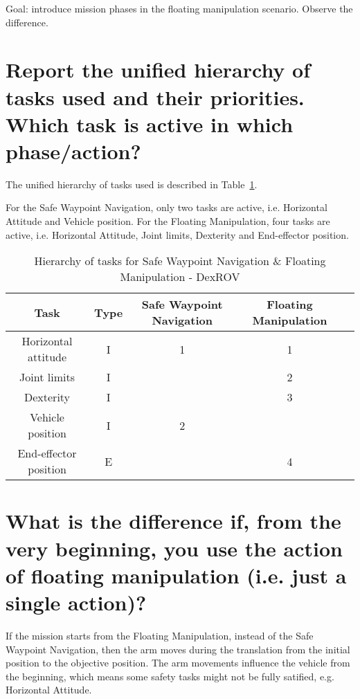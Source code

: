 	Goal: introduce mission phases in the floating manipulation scenario. Observe
	the difference.
	\begin{parts}
		\part{Report the unified hierarchy of tasks used and their
		priorities. Which task is active in which phase/action?}

		\begin{solutionorbox}
			The unified hierarchy of tasks used is described in
			Table~\ref{table:tkip_swn_fm_dexrov}. 

			For the Safe Waypoint Navigation, only two tasks are
			active, i.e. Horizontal Attitude and Vehicle position.
			For the Floating Manipulation, four tasks are active,
			i.e. Horizontal Attitude, Joint limits, Dexterity and
			End-effector position.
		\end{solutionorbox}
		
		\begin{table}[htb] 
			\caption{Hierarchy of tasks for Safe Waypoint Navigation
			\& Floating Manipulation - DexROV}
			\label{table:tkip_swn_fm_dexrov}
			\begin{center}
				\footnotesize
				\begin{tabular}{ccccc}
					\toprule Task & Type &
					Safe Waypoint Navigation & Floating
					Manipulation\\
					\midrule 
					\hdashline Horizontal attitude & I & 1
									& 1\\ 
					\hdashline Joint limits & I && 2\\
					\hdashline Dexterity & I && 3\\
					\hdashline Vehicle position & I & 2 \\ 
					\hdashline End-effector position & E
									 &&4\\ 
					\bottomrule
				\end{tabular}%
			\end{center}%
		\end{table}%

		\part{What is the difference if, from the very beginning, you use
		the action of floating manipulation (i.e. just a single action)?}

		\begin{solutionorbox}
			If the mission starts from the Floating Manipulation,
			instead of the Safe Waypoint Navigation, then the arm
			moves during the translation from the initial position
			to the objective position. The arm movements influence
			the vehicle from the beginning, which means some safety
			tasks might not be fully satified, e.g. Horizontal
			Attitude.
		\end{solutionorbox}

	\end{parts}

